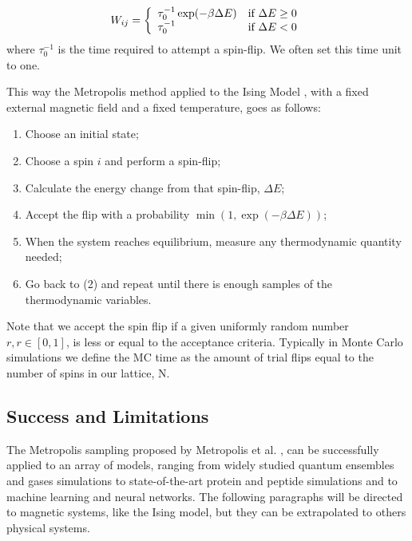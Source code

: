 \begin{equation}
	W_{ij} = \left\{ \begin{array}{ll}  \tau_0^{-1} \exp(-\beta \Delta E)  & \mbox{if } \Delta E \geq 0 \\ \tau_0^{-1} & \mbox{if } \Delta E < 0 \end{array} \right.
\end{equation}
where $\tau_0^{-1}$ is the time required to attempt a spin-flip.  We often set this time unit to one.

This way the Metropolis method applied to the Ising Model \cite{Landau_Book}, with a fixed external magnetic field and a fixed temperature, goes as follows:

\begin{enumerate}
\item Choose an initial state;
\item Choose a spin $i$ and perform a spin-flip;                                                                                                                                       
\item Calculate the energy change from that spin-flip, $\Delta E$;
\item Accept the flip with a probability $\min \left( 1, \exp(-\beta \Delta E) \right)$; 
\item When the system reaches equilibrium, measure any thermodynamic quantity needed;                                                                                                        
\item Go back to (2) and repeat until there is enough samples of the thermodynamic variables.                                                                                                                    
\end{enumerate}
Note that we accept the spin flip if a given uniformly random number $r, r \in [0,1]$, is less or equal to the acceptance criteria. Typically in Monte Carlo simulations we define the MC time as the amount of trial flips equal to the number of spins in our lattice, N.

\subsection{Success and Limitations}

The Metropolis sampling proposed by Metropolis et al. \cite{Metropolis1953}, can be successfully applied to an array of models, ranging from widely studied quantum ensembles and gases simulations to state-of-the-art protein and peptide simulations and to machine learning and neural networks. The following paragraphs will be directed to magnetic systems, like the Ising model, but they can be extrapolated to others physical systems. 

